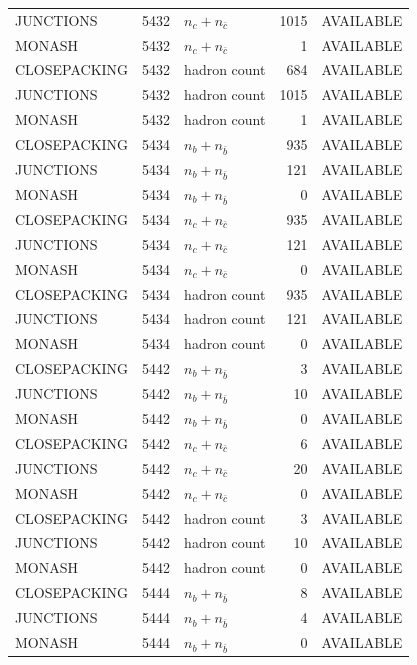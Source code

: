 \begin{landscape}
\begin{longtable}{@{}lrlrl@{}}
JUNCTIONS & 5432 & $n_c+n_{\bar c}$ & \num{1015} & AVAILABLE \\
MONASH & 5432 & $n_c+n_{\bar c}$ & \num{1} & AVAILABLE \\
CLOSEPACKING & 5432 & hadron count & \num{684} & AVAILABLE \\
JUNCTIONS & 5432 & hadron count & \num{1015} & AVAILABLE \\
MONASH & 5432 & hadron count & \num{1} & AVAILABLE \\
CLOSEPACKING & 5434 & $n_b+n_{\bar b}$ & \num{935} & AVAILABLE \\
JUNCTIONS & 5434 & $n_b+n_{\bar b}$ & \num{121} & AVAILABLE \\
MONASH & 5434 & $n_b+n_{\bar b}$ & \num{0} & AVAILABLE \\
CLOSEPACKING & 5434 & $n_c+n_{\bar c}$ & \num{935} & AVAILABLE \\
JUNCTIONS & 5434 & $n_c+n_{\bar c}$ & \num{121} & AVAILABLE \\
MONASH & 5434 & $n_c+n_{\bar c}$ & \num{0} & AVAILABLE \\
CLOSEPACKING & 5434 & hadron count & \num{935} & AVAILABLE \\
JUNCTIONS & 5434 & hadron count & \num{121} & AVAILABLE \\
MONASH & 5434 & hadron count & \num{0} & AVAILABLE \\
CLOSEPACKING & 5442 & $n_b+n_{\bar b}$ & \num{3} & AVAILABLE \\
JUNCTIONS & 5442 & $n_b+n_{\bar b}$ & \num{10} & AVAILABLE \\
MONASH & 5442 & $n_b+n_{\bar b}$ & \num{0} & AVAILABLE \\
CLOSEPACKING & 5442 & $n_c+n_{\bar c}$ & \num{6} & AVAILABLE \\
JUNCTIONS & 5442 & $n_c+n_{\bar c}$ & \num{20} & AVAILABLE \\
MONASH & 5442 & $n_c+n_{\bar c}$ & \num{0} & AVAILABLE \\
CLOSEPACKING & 5442 & hadron count & \num{3} & AVAILABLE \\
JUNCTIONS & 5442 & hadron count & \num{10} & AVAILABLE \\
MONASH & 5442 & hadron count & \num{0} & AVAILABLE \\
CLOSEPACKING & 5444 & $n_b+n_{\bar b}$ & \num{8} & AVAILABLE \\
JUNCTIONS & 5444 & $n_b+n_{\bar b}$ & \num{4} & AVAILABLE \\
MONASH & 5444 & $n_b+n_{\bar b}$ & \num{0} & AVAILABLE \\

\end{longtable}
\end{landscape}
